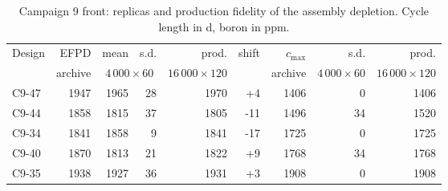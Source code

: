 \begin{table}[htbp]
  \centering
  \small
  \caption{Campaign 9 front: replicas and production fidelity of the assembly depletion. Cycle length in d, boron in ppm.}
  \label{tab:c9-dep-replicas}
  \begin{tabular}{@{}lrrrrrrrr@{}}
    \toprule
    Design & EFPD & mean & s.d. & prod. & shift & $c_\mathrm{max}$ & s.d. & prod. \\
    & archive & \multicolumn{2}{c}{$4\,000\times60$} & $16\,000\times120$ & & archive & $4\,000\times60$ & $16\,000\times120$ \\
    \midrule
    C9-47 & 1947 & 1965 & 28 & 1970 & +4 & 1406 & 0 & 1406 \\
    C9-44 & 1858 & 1815 & 37 & 1805 & -11 & 1496 & 34 & 1520 \\
    C9-34 & 1841 & 1858 & 9 & 1841 & -17 & 1725 & 0 & 1725 \\
    C9-40 & 1870 & 1813 & 21 & 1822 & +9 & 1768 & 34 & 1768 \\
    C9-35 & 1938 & 1927 & 36 & 1931 & +3 & 1908 & 0 & 1908 \\
    \bottomrule
  \end{tabular}
\end{table}

